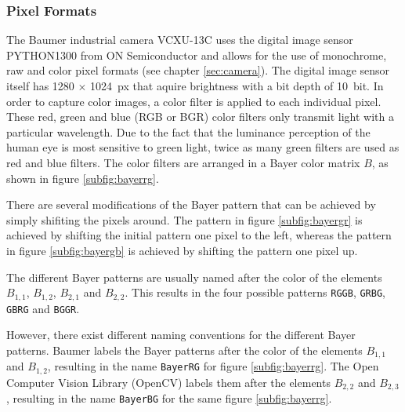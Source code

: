 \subsubsection{Pixel Formats}
\label{subsubsec:pixel_format}

The Baumer industrial camera VCXU-13C uses the digital image sensor PYTHON1300 from ON Semiconductor and allows for the use of monochrome, raw and color pixel formats (see chapter \ref{sec:camera}).
The digital image sensor itself has 1280 $\times$ \SI{1024}{px} that aquire brightness with a bit depth of \SI{10}{bit}.
In order to capture color images, a color filter is applied to each individual pixel.
These red, green and blue (RGB or BGR) color filters only transmit light with a particular wavelength.
Due to the fact that the luminance perception of the human eye is most sensitive to green light, twice as many green filters are used as red and blue filters.
The color filters are arranged in a Bayer color matrix $B$, as shown in figure \ref{subfig:bayerrg}.

There are several modifications of the Bayer pattern that can be achieved by simply shifiting the pixels around.
The pattern in figure \ref{subfig:bayergr} is achieved by shifting the initial pattern one pixel to the left, whereas the pattern in figure \ref{subfig:bayergb} is achieved by shifting the pattern one pixel up.

The different Bayer patterns are usually named after the color of the elements $B_{1,1}$, $B_{1,2}$, $B_{2,1}$ and $B_{2,2}$.
This results in the four possible patterns \texttt{RGGB}, \texttt{GRBG}, \texttt{GBRG} and \texttt{BGGR}.

However, there exist different naming conventions for the different Bayer patterns.
Baumer labels the Bayer patterns after the color of the elements $B_{1,1}$ and $B_{1,2}$, resulting in the name \texttt{BayerRG} for figure \ref{subfig:bayerrg}.
The Open Computer Vision Library (OpenCV) labels them after the elements $B_{2,2}$ and $B_{2,3}$, resulting in the name \texttt{BayerBG} for the same figure \ref{subfig:bayerrg}.

